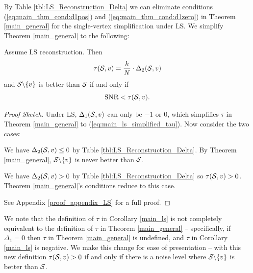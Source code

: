 By Table \ref{tbl:LS_Reconstruction_Delta} we can eliminate conditions (\ref{eq:main_thm_cond:d1pos}) and (\ref{eq:main_thm_cond:d1zero}) in Theorem \ref{main_general} for the single-vertex simplification under LS.
We simplify Theorem \ref{main_general} to the following:

\begin{corollary}
\label{main_ls}
    Assume LS reconstruction. Then 
    \begin{equation}
        \tau(\mathcal{S},v) = \frac{k}{N} \cdot \Delta_{2}(\mathcal{S},v) \label{eq:main_ls_simplified_tau}
    \end{equation}
    and  $\mathcal{S} \backslash \{v\}$ is better than $\mathcal{S}$ if and only if
 \begin{equation}
 \label{eq:LS_corol_iff}
     \textrm{SNR} < \tau(\mathcal{S},v).
 \end{equation}
 \end{corollary}
\begin{proof}[Proof Sketch]  Under LS, $\Delta_{1}(\mathcal{S},v)$ can only be $-1$ or $0$, which simplifies $\tau$ in Theorem \ref{main_general} to (\ref{eq:main_ls_simplified_tau}). Now consider the two cases:
\begin{description}[leftmargin=!, labelwidth=\widthof{{If $\Delta_{1}(\set{S},v) = -1$:}}]
\item[{If $\Delta_{1}(\set{S},v) = 0$:}] 
We have $\Delta_{2}(\mathcal{S},v) \leq 0$ by Table \ref{tbl:LS_Reconstruction_Delta}. By Theorem \ref{main_general}, $\mathcal{S} \backslash \{v\}$ is never better than $\mathcal{S}$.

\item[{If $\Delta_{1}(\set{S},v) = -1$:}] 
We have $\Delta_{2}(\mathcal{S},v) > 0$ by Table \ref{tbl:LS_Reconstruction_Delta} so $\tau(\mathcal{S},v) > 0$. Theorem \ref{main_general}'s conditions reduce to this case.
\end{description}
See Appendix \ref{proof_appendix_LS} for a full proof.
\end{proof}

{\color{black} We note that the definition of $\tau$ in Corollary \ref{main_ls} is not completely equivalent to the definition of $\tau$ in Theorem \ref{main_general} -- specifically, if $\Delta_{1} = 0$ then $\tau$ in Theorem \ref{main_general} is undefined, and $\tau$ in Corollary \ref{main_ls} is negative. We make this change for ease of presentation -- with this new definition $\tau(\mathcal{S},v) > 0$ if and only if there is a noise level where $\mathcal{S} \backslash \{v\}$ is better than $\mathcal{S}$. }

